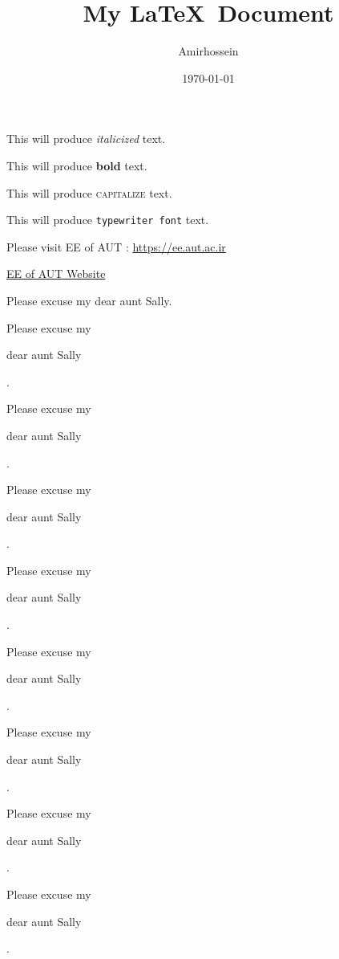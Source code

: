 \documentclass[11pt]{article}
\title{My \LaTeX\ Document}
\author{Amirhossein}
\date{\today}
\begin{document}
\tableofcontents
\maketitle


	This will produce \textit{italicized} text.
	
	This will produce \textbf{bold} text.

	This will produce \textsc{capitalize} text.
	
	This will produce \texttt{typewriter font} text.		
	
	Please visit EE of AUT : \url{https://ee.aut.ac.ir}
	
	\href{https://ee.aut.ac.ir}{EE of AUT Website}
	
	\vspace{2cm}
	
	Please excuse my dear aunt Sally.
	
	Please excuse my \begin{large} dear aunt Sally \end{large}.
	
	Please excuse my \begin{Large} dear aunt Sally \end{Large}.
	
	Please excuse my \begin{huge} dear aunt Sally \end{huge}.
	
	Please excuse my \begin{Huge} dear aunt Sally \end{Huge}.
	
	\vspace{1cm}
	
	Please excuse my \begin{normalsize} dear aunt Sally \end{normalsize}.
	
	Please excuse my \begin{small} dear aunt Sally \end{small}.
	
	Please excuse my \begin{scriptsize} dear aunt Sally \end{scriptsize}.
	
	Please excuse my \begin{tiny} dear aunt Sally \end{tiny}.
	
	\vspace{2cm}
	
\end{document}
